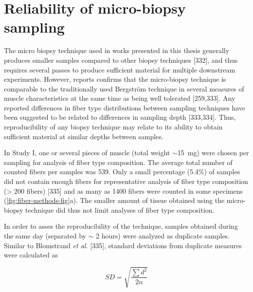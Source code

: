 \documentclass[twoside,10pt]{gihclass} %
\begin{document}
\hypertarget{reliability-of-micro-biopsy-sampling}{%
\section{Reliability of micro-biopsy sampling}\label{reliability-of-micro-biopsy-sampling}}

The micro biopsy technique used in works presented in this thesis generally produces smaller samples compared to other
biopsy techniques
{[}332{]}, and thus
requires several passes to produce sufficient material for multiple
downstream experiments. However, reports confirms that the micro-biopsy
technique is comparable to the traditionally used Bergström technique in
several measures of muscle characteristics at the same time as being
well tolerated {[}259,333{]}.
Any reported differences in fiber type distributions between sampling techniques have been suggested to be related
to differences in sampling depth {[}333,334{]}.
Thus, reproducibility of any biopsy technique may relate to its ability to obtain sufficient material at similar depths between samples.

In Study I, one or several pieces of muscle (total weight
\(\sim\)\SI{15}{mg}) were chosen per sampling for analysis of fiber type
composition. The average total number of counted fibers per samples was 539.
Only a small percentage (5.4\%) of samples did not contain enough fibers for representative analysis of fiber type composition (\textgreater{} 200 fibers)
{[}335{]}
and as many as 1400 fibers were counted in some specimens (\ref{fig:fiber-methods-fig}a).
The smaller amount of tissue obtained using the micro-biopsy technique did thus not limit analyses of fiber type composition.

In order to asses the reproducibility of the technique, samples obtained during the same day (separated by \(\sim\) 2 hours) were analyzed as duplicate samples.
Similar to Blomstrand \emph{et al.} {[}335{]}, standard deviations from duplicate measures were calculated as

\[SD = \sqrt{\frac{\sum{d^2}}{2n}}\]
\end{document}
